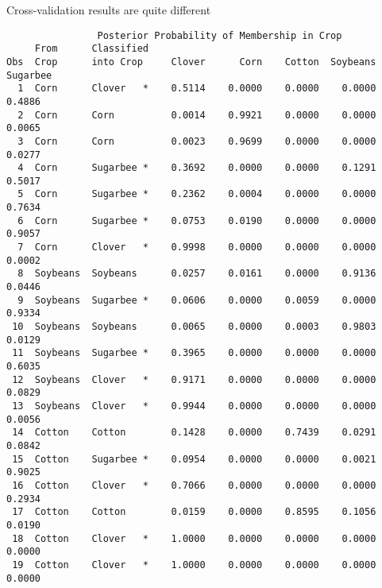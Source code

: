 \documentclass[pdf]{prosper}
\begin{document}
\begin{slide}{Cross-validation results are quite different}

{\scriptsize
\begin{verbatim}
                Posterior Probability of Membership in Crop
     From      Classified
Obs  Crop      into Crop     Clover      Corn    Cotton  Soybeans  Sugarbee
  1  Corn      Clover   *    0.5114    0.0000    0.0000    0.0000    0.4886
  2  Corn      Corn          0.0014    0.9921    0.0000    0.0000    0.0065
  3  Corn      Corn          0.0023    0.9699    0.0000    0.0000    0.0277
  4  Corn      Sugarbee *    0.3692    0.0000    0.0000    0.1291    0.5017
  5  Corn      Sugarbee *    0.2362    0.0004    0.0000    0.0000    0.7634
  6  Corn      Sugarbee *    0.0753    0.0190    0.0000    0.0000    0.9057
  7  Corn      Clover   *    0.9998    0.0000    0.0000    0.0000    0.0002
  8  Soybeans  Soybeans      0.0257    0.0161    0.0000    0.9136    0.0446
  9  Soybeans  Sugarbee *    0.0606    0.0000    0.0059    0.0000    0.9334
 10  Soybeans  Soybeans      0.0065    0.0000    0.0003    0.9803    0.0129
 11  Soybeans  Sugarbee *    0.3965    0.0000    0.0000    0.0000    0.6035
 12  Soybeans  Clover   *    0.9171    0.0000    0.0000    0.0000    0.0829
 13  Soybeans  Clover   *    0.9944    0.0000    0.0000    0.0000    0.0056
 14  Cotton    Cotton        0.1428    0.0000    0.7439    0.0291    0.0842
 15  Cotton    Sugarbee *    0.0954    0.0000    0.0000    0.0021    0.9025
 16  Cotton    Clover   *    0.7066    0.0000    0.0000    0.0000    0.2934
 17  Cotton    Cotton        0.0159    0.0000    0.8595    0.1056    0.0190
 18  Cotton    Clover   *    1.0000    0.0000    0.0000    0.0000    0.0000
 19  Cotton    Clover   *    1.0000    0.0000    0.0000    0.0000    0.0000
\end{verbatim}
}
\end{slide}
\end{document}
